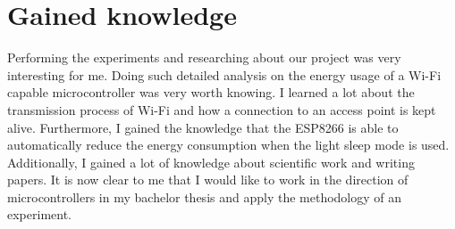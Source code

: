 \section*{Gained knowledge}
Performing the experiments and researching about our project was very interesting for me. Doing such detailed analysis on the energy usage of a Wi-Fi capable microcontroller was very worth knowing. I learned a lot about the transmission process of Wi-Fi and how a connection to an access point is kept alive. Furthermore, I gained the knowledge that the ESP8266 is able to automatically reduce the energy consumption when the light sleep mode is used. Additionally, I gained a lot of knowledge about scientific work and writing papers.
It is now clear to me that I would like to work in the direction of microcontrollers in my bachelor thesis and apply the methodology of an experiment. 
